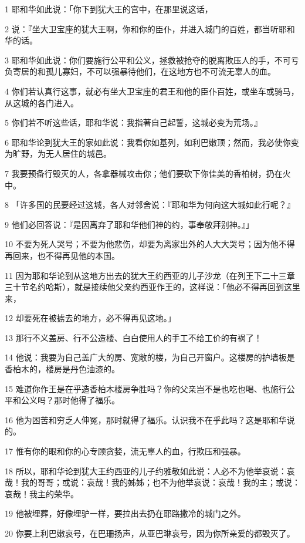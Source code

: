 \par 1 耶和华如此说：「你下到犹大王的宫中，在那里说这话，
\par 2 说：『坐大卫宝座的犹大王啊，你和你的臣仆，并进入城门的百姓，都当听耶和华的话。
\par 3 耶和华如此说：你们要施行公平和公义，拯救被抢夺的脱离欺压人的手，不可亏负寄居的和孤儿寡妇，不可以强暴待他们，在这地方也不可流无辜人的血。
\par 4 你们若认真行这事，就必有坐大卫宝座的君王和他的臣仆百姓，或坐车或骑马，从这城的各门进入。
\par 5 你们若不听这些话，耶和华说：我指著自己起誓，这城必变为荒场。』
\par 6 耶和华论到犹大王的家如此说：我看你如基列，如利巴嫩顶；然而，我必使你变为旷野，为无人居住的城邑。
\par 7 我要预备行毁灭的人，各拿器械攻击你；他们要砍下你佳美的香柏树，扔在火中。
\par 8 「许多国的民要经过这城，各人对邻舍说：『耶和华为何向这大城如此行呢？』
\par 9 他们必回答说：『是因离弃了耶和华他们神的约，事奉敬拜别神。』」
\par 10 不要为死人哭号；不要为他悲伤，却要为离家出外的人大大哭号；因为他不得再回来，也不得再见他的本国。
\par 11 因为耶和华论到从这地方出去的犹大王约西亚的儿子沙龙（在列王下二十三章三十节名约哈斯），就是接续他父亲约西亚作王的，这样说：「他必不得再回到这里来，
\par 12 却要死在被掳去的地方，必不得再见这地。」
\par 13 那行不义盖房、行不公造楼、白白使用人的手工不给工价的有祸了！
\par 14 他说：我要为自己盖广大的房、宽敞的楼，为自己开窗户。这楼房的护墙板是香柏木的，楼房是丹色油漆的。
\par 15 难道你作王是在乎造香柏木楼房争胜吗？你的父亲岂不是也吃也喝、也施行公平和公义吗？那时他得了福乐。
\par 16 他为困苦和穷乏人伸冤，那时就得了福乐。认识我不在乎此吗？这是耶和华说的。
\par 17 惟有你的眼和你的心专顾贪婪，流无辜人的血，行欺压和强暴。
\par 18 所以，耶和华论到犹大王约西亚的儿子约雅敬如此说：人必不为他举哀说：哀哉！我的哥哥；或说：哀哉！我的姊姊；也不为他举哀说：哀哉！我的主；或说：哀哉！我主的荣华。
\par 19 他被埋葬，好像埋驴一样，要拉出去扔在耶路撒冷的城门之外。
\par 20 你要上利巴嫩哀号，在巴珊扬声，从亚巴琳哀号，因为你所亲爱的都毁灭了。

